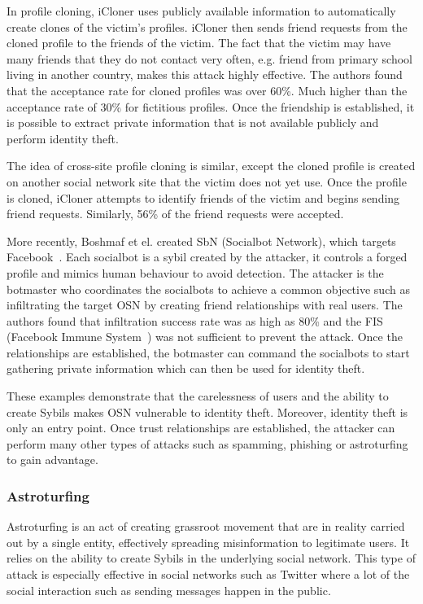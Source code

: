 In profile cloning, iCloner uses publicly available information to automatically
create clones of the victim's profiles. iCloner then sends friend requests from
the cloned profile to the friends of the victim. The fact that the victim may
have many friends that they do not contact very often, e.g. friend from primary
school living in another country, makes this attack highly effective. The
authors found that the acceptance rate for cloned profiles was over 60\%. Much
higher than the acceptance rate of 30\% for fictitious profiles. Once the
friendship is established, it is possible to extract private information that is
not available publicly and perform identity theft.

The idea of cross-site profile cloning is similar, except the cloned profile is
created on another social network site that the victim does not yet use. Once
the profile is cloned, iCloner attempts to identify friends of the
victim and begins sending friend requests. Similarly, 56\% of the friend
requests were accepted. 

More recently, Boshmaf et el. created SbN (Socialbot Network), which targets
Facebook~\cite{boshmaf2011socialbot}. Each socialbot is a sybil created by the
attacker, it controls a forged profile and mimics human behaviour to avoid
detection. The attacker is the botmaster who coordinates the socialbots to
achieve a common objective such as infiltrating the target OSN by creating
friend relationships with real users. The authors found that infiltration
success rate was as high as 80\% and the FIS (Facebook Immune
System~\cite{stein2011facebook}) was not sufficient to prevent the attack. Once
the relationships are established, the botmaster can command the socialbots to
start gathering private information which can then be used for identity theft.


These examples demonstrate that the carelessness of users and the ability to
create Sybils makes OSN vulnerable to identity theft. Moreover, identity theft
is only an entry point. Once trust relationships are established, the attacker
can perform many other types of attacks such as spamming, phishing or
astroturfing to gain advantage.

\subsubsection{Astroturfing}
Astroturfing is an act of creating grassroot movement that are in reality
carried out by a single entity, effectively spreading misinformation to
legitimate users. It relies on the ability to create Sybils in the underlying
social network. This type of attack is especially effective in social networks
such as Twitter where a lot of the social interaction such as sending messages
happen in the public.

